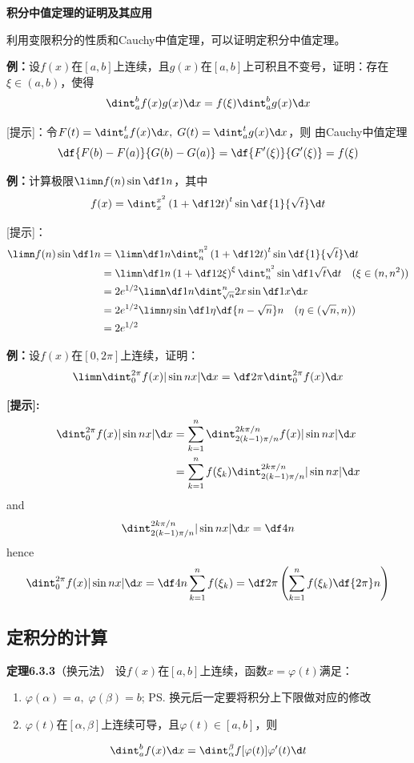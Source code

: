 \begin{shaded}
	{\bf 积分中值定理的证明及其应用}
	
	利用变限积分的性质和Cauchy中值定理，可以证明定积分中值定理。

	{\bf 例：}设$f(x)$在$[a,b]$上连续，且$g(x)$在$[a,b]$上可积且不变号，证明：存在
	$\xi\in(a,b)$，使得
	$$\dint_a^bf(x)g(x)\d x=f(\xi)\dint_a^bg(x)\d x$$
	
	[提示]：令$F(t)=\dint_a^tf(x)\d x,\;G(t)=\dint_a^tg(x)\d x$，则
	由Cauchy中值定理
	$$\df{F(b)-F(a)}{G(b)-G(a)}=\df{F'(\xi)}{G'(\xi)}=f(\xi)$$
	
	{\bf 例：}计算极限$\limn f(n)\sin\df 1n$，其中
	  $$f(x)=\dint_x^{x^2}\left(1+\df 1{2t}\right)^t\sin\df{1}{\sqrt t}\d t$$
	
	[提示]：
	\begin{align}
		\limn f(n)\sin\df 1n&=\limn\df1n\dint_n^{n^2}\left(1+\df
		1{2t}\right)^t\sin\df{1}{\sqrt t}\d t\notag\\
		&=\limn\df1n\left(1+\df1{2\xi}\right)^{\xi}\dint_n^{n^2}
		\sin\df1{\sqrt t}\d t\quad(\xi\in(n,n^2))\notag\\
		&=2e^{1/2}\limn\df1n\dint_{\sqrt n}^n2x\sin\df1x\d x\notag\\
		&=2e^{1/2}\limn\eta\sin\df1{\eta}\df{n-\sqrt n}n\quad(\eta\in(\sqrt
		n,n))\notag\\
		&=2e^{1/2}\notag
	\end{align}
	
	{\bf 例：}设$f(x)$在$[0,2\pi]$上连续，证明：
	$$\limn\dint_0^{2\pi}f(x)|\sin nx|\d x=\df 2{\pi}\dint_0^{2\pi}f(x)\d x$$
	
	{\bf [提示]:}
	\begin{align}
	\dint_0^{2\pi}f(x)|\sin nx|\d x
	&=\sum\limits_{k=1}^n\dint_{2(k-1)\pi/n}^{2k\pi/n}f(x)|\sin nx|\d x\notag\\
	&=\sum\limits_{k=1}^nf(\xi_k)\dint_{2(k-1)\pi/n}^{2k\pi/n}|\sin nx|\d x\notag
	\end{align}
	and
	$$\dint_{2(k-1)\pi/n}^{2k\pi/n}|\sin nx|\d x=\df4n$$
	hence
	$$\dint_0^{2\pi}f(x)|\sin nx|\d x=\df4n\sum\limits_{k=1}^nf(\xi_k)
	=\df2{\pi}\left(\sum\limits_{k=1}^nf(\xi_k)\df{2\pi}n\right)$$
\end{shaded}

\subsection{定积分的计算}

{\bf 定理6.3.3}（换元法）
设$f(x)$在$[a,b]$上连续，函数$x=\varphi(t)$满足：
\begin{enumerate}[(1)]
  \setlength{\itemindent}{1cm}
  \item $\varphi(\alpha)=a,\;\varphi(\beta)=b$;
  \ps{换元后一定要将积分上下限做对应的修改}
  \item $\varphi(t)$在$[\alpha,\beta]$上连续可导，且$\varphi(t)\in[a,b]$，则
\end{enumerate}
$${\dint_a^bf(x)\d
x=\dint_{\alpha}^{\beta}f[\varphi(t)]\varphi'(t)\d t}$$

